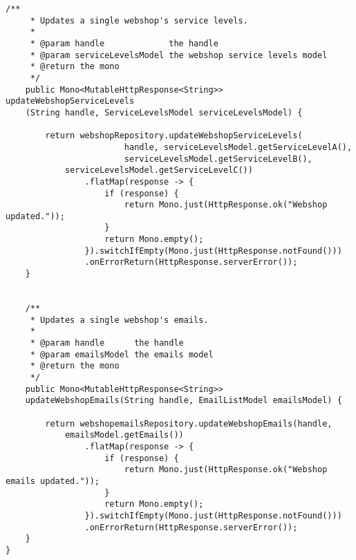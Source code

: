 \begin{lstlisting}[frame=bt,numbers=none]
	/**
	 * Updates a single webshop's service levels.
	 *
	 * @param handle             the handle
	 * @param serviceLevelsModel the webshop service levels model
	 * @return the mono
	 */
	public Mono<MutableHttpResponse<String>> updateWebshopServiceLevels
	(String handle, ServiceLevelsModel serviceLevelsModel) {

		return webshopRepository.updateWebshopServiceLevels(
						handle, serviceLevelsModel.getServiceLevelA(),
						serviceLevelsModel.getServiceLevelB(),
            serviceLevelsModel.getServiceLevelC())
				.flatMap(response -> {
					if (response) {
						return Mono.just(HttpResponse.ok("Webshop updated."));
					}
					return Mono.empty();
				}).switchIfEmpty(Mono.just(HttpResponse.notFound()))
				.onErrorReturn(HttpResponse.serverError());
	}


	/**
	 * Updates a single webshop's emails.
	 *
	 * @param handle      the handle
	 * @param emailsModel the emails model
	 * @return the mono
	 */
	public Mono<MutableHttpResponse<String>>
    updateWebshopEmails(String handle, EmailListModel emailsModel) {

		return webshopemailsRepository.updateWebshopEmails(handle,
			emailsModel.getEmails())
				.flatMap(response -> {
					if (response) {
						return Mono.just(HttpResponse.ok("Webshop emails updated."));
					}
					return Mono.empty();
				}).switchIfEmpty(Mono.just(HttpResponse.notFound()))
				.onErrorReturn(HttpResponse.serverError());
	}
}
\end{lstlisting}